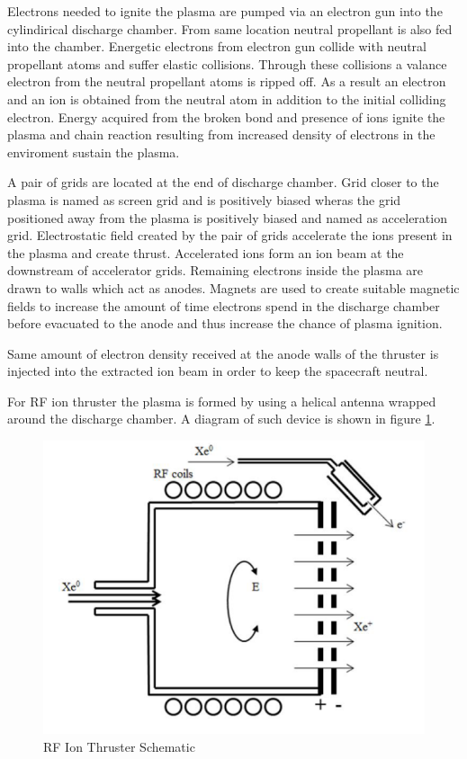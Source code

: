 Electrons needed to ignite the plasma are pumped via an electron gun into the cylindirical discharge chamber. From same location neutral propellant is also fed into the chamber. Energetic electrons from electron gun collide with neutral propellant atoms and suffer elastic collisions. Through these collisions a valance electron from the neutral propellant atoms is ripped off. As a result an electron and an ion is obtained from the neutral atom in addition to the initial colliding electron. Energy acquired from the broken bond and presence of ions ignite the plasma and chain reaction resulting from increased density of electrons in the enviroment sustain the plasma\cite{goebel2008fundamentals}.
\par A pair of grids are located at the end of discharge chamber. Grid closer to the plasma is named as screen grid and is positively biased wheras the grid positioned away from the plasma is positively biased and named as acceleration grid. Electrostatic field created by the pair of grids accelerate the ions present in the plasma and create thrust\cite{kokal2017design}. Accelerated ions form an ion beam at the downstream of accelerator grids. Remaining electrons inside the plasma are drawn to walls which act as anodes. Magnets are used to create suitable magnetic fields to increase the amount of time electrons spend in the discharge chamber before evacuated to the anode and thus increase the chance of plasma ignition\cite{OCW1964}.
\par Same amount of electron density received at the anode walls of the thruster is injected into the extracted ion beam in order to keep the spacecraft neutral.

For RF ion thruster the plasma is formed by using a helical antenna wrapped around the discharge chamber. A diagram of such device is shown in figure \ref{fig:rfschematic}.

\begin{figure}[ht]
    \centering
    \includegraphics[scale=0.75]{fig/rfschematic.png}
    \caption[RF Ion Thruster Schematic]{RF Ion Thruster Schematic\cite{kokal2017design}}
    \label{fig:rfschematic}
\end{figure}

